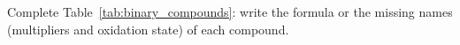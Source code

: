\begin{landscape}
        \begin{exercise}
            \ifdefined\LibroENG
                Complete Table~\ref{tab:binary_compounds}: write the formula or the missing names (multipliers and oxidation state) of each compound.

\end{exercise}
\end{landscape}
